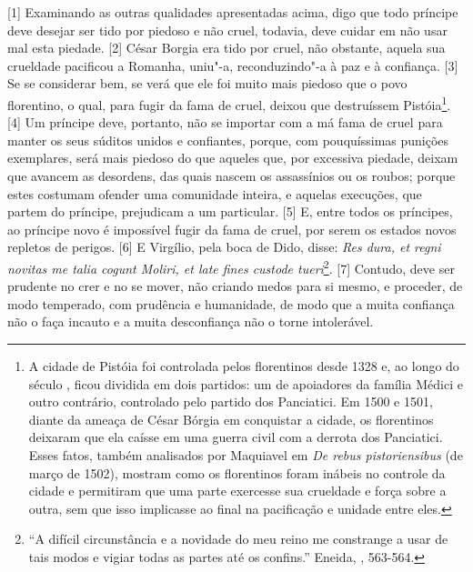 {[}1{]} Examinando as outras qualidades apresentadas acima, digo que
todo príncipe deve desejar ser tido por piedoso e não cruel, todavia,
deve cuidar em não usar mal esta piedade. {[}2{]} César Borgia era tido
por cruel, não obstante, aquela sua crueldade pacificou a Romanha,
uniu"-a, reconduzindo"-a à paz e à confiança. {[}3{]} Se se considerar
bem, se verá que ele foi muito mais piedoso que o povo florentino, o
qual, para fugir da fama de cruel, deixou que destruíssem
Pistóia\footnote{A cidade de Pistóia foi controlada pelos florentinos
  desde 1328 e, ao longo do século , ficou dividida em dois partidos:
  um de apoiadores da família Médici e outro contrário, controlado pelo
  partido dos Panciatici. Em 1500 e 1501, diante da ameaça de César
  Bórgia em conquistar a cidade, os florentinos deixaram que ela caísse
  em uma guerra civil com a derrota dos Panciatici. Esses fatos, também
  analisados por Maquiavel em \emph{De rebus pistoriensibus} (de março
  de 1502), mostram como os florentinos foram inábeis no controle da
  cidade e permitiram que uma parte exercesse sua crueldade e força
  sobre a outra, sem que isso implicasse ao final na pacificação e
  unidade entre eles.}. {[}4{]} Um príncipe deve, portanto, não se
importar com a má fama de cruel para manter os seus súditos unidos e
confiantes, porque, com pouquíssimas punições exemplares, será mais
piedoso do que aqueles que, por excessiva piedade, deixam que avancem as
desordens, das quais nascem os assassínios ou os roubos; porque estes
costumam ofender uma comunidade inteira, e aquelas execuções, que partem
do príncipe, prejudicam a um particular. {[}5{]} E, entre todos os
príncipes, ao príncipe novo é impossível fugir da fama de cruel, por
serem os estados novos repletos de perigos. {[}6{]} E Virgílio, pela
boca de Dido, disse: \emph{Res dura, et regni novitas me talia cogunt
Moliri, et late fines custode tueri}\footnote{``A difícil circunstância
  e a novidade do meu reino me constrange a usar de tais modos e vigiar
  todas as partes até os confins.'' Eneida, , 563-564.}. {[}7{]}
Contudo, deve ser prudente no crer e no se mover, não criando medos para
si mesmo, e proceder, de modo temperado, com prudência e humanidade, de
modo que a muita confiança não o faça incauto e a muita desconfiança não
o torne intolerável.


